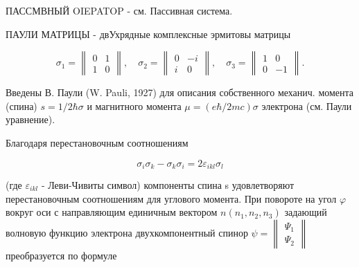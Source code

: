 \documentclass[10pt]{article}
\begin{document}
ПАССМВНЫЙ OIEPATOP - см. Пассивная система.



ПАУЛИ МАТРИЦЫ - двУхрядные комплексные эрмитовы матрицы



\[

\sigma_{1}=\left\|\begin{array}{cc}

0 & 1 \\

1 & 0

\end{array}\right\|, \quad \sigma_{2}=\left\|\begin{array}{cc}

0 & -i \\

i & 0

\end{array}\right\|, \quad \sigma_{3}=\left\|\begin{array}{cc}

1 & 0 \\

0 & -1

\end{array}\right\| .

\]



Введены В. Паули (W. Pauli, 1927) для описания собственного механич. момента (спина) $s=1 / 2 \hbar \sigma$ и магнитного момента $\mu=(e \hbar / 2 m c) \sigma$ электрона (см. Паули уравнение).



Благодаря перестановочным соотношениям



\[

\sigma_{i} \sigma_{k}-\sigma_{k} \sigma_{i}=2 \varepsilon_{i k l} \sigma_{l}

\]



(где $\varepsilon_{i k l}$ - Леви-Чивиты символ) компоненты спина s удовлетворяют перестановочным соотношениям для углового момента. При повороте на угол $\varphi$ вокруг оси с направляющим единичным вектором $n\left(n_{1}, n_{2}, n_{3}\right)$ задающий волновую функцию электрона двухкомпонентный спинор $\psi=\left\|\begin{array}{l}\Psi_{1} \\ \Psi_{2}\end{array}\right\|$ преобразуется по формуле
\end{document}

